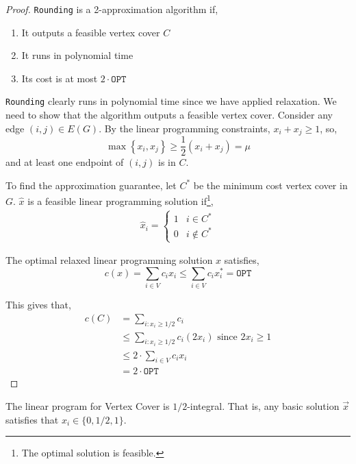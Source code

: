 \begin{proof}
	\texttt{Rounding} is a 2-approximation algorithm if,
	\begin{enumerate}
		\item It outputs a feasible vertex cover $C$
		\item It runs in polynomial time
		\item Its cost is at most $2 \cdot \texttt{OPT}$
	\end{enumerate}
	\noindent \texttt{Rounding} clearly runs in polynomial time since we have applied relaxation. We need to show that the algorithm outputs a feasible vertex cover. Consider any edge $(i,j) \in E(G)$. By the linear programming constraints, $x_i + x_j \geq 1$, so,
	\[\max\left\{x_{i}, x_{j}\right\} \geq \frac{1}{2}\left(x_{i}+x_{j}\right) = \mu\]
	\noindent and at least one endpoint of $(i,j)$ is in $C$.

	To find the approximation guarantee, let $C^*$ be the minimum cost vertex cover in $G$. $\hat{x}$ is a feasible linear programming solution if\footnote{The optimal solution is feasible.},
	\begin{align*}
	 	\hat{x}_{i}= \begin{cases}1 & i \in C^{*} \\ 0 & i \not\in C^{*}\end{cases}
	 \end{align*}

	\noindent The optimal relaxed linear programming solution $x$ satisfies,
	\[c\left(x\right)=\sum_{i \in V} c_{i} x_{i} \leq \sum_{i \in V} c_{i} x^*_{i} = \texttt{OPT}\]

	\noindent This gives that,
	\begin{align*}
		c(C) &= \sum_{i : x_i \geq 1/2} c_i \\
			 &\leq \sum_{i : x_i \geq 1/2} c_i (2 x_i) \text{ since $2 x_i \geq 1$}\\
			 &\leq 2 \cdot \sum_{i \in V} c_i x_i \\
			 &= 2 \cdot \texttt{OPT}
	\end{align*}
\end{proof}

\begin{thm}
	The linear program for Vertex Cover is $1/2$-integral. That is, any basic solution $\Vec{x}$ satisfies that $x_i \in \{0,1/2,1\}$.
\end{thm}

